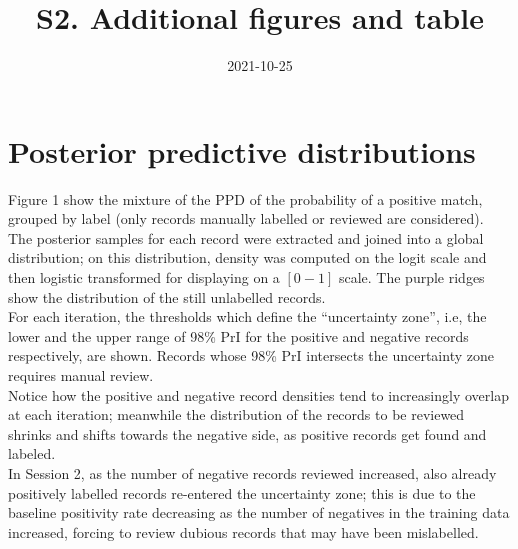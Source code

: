 \documentclass[
]{article}
\title{S2. Additional figures and table}
\author{}
\date{\vspace{-2.5em}2021-10-25}
\begin{document}
\maketitle

{
\setcounter{tocdepth}{2}
\tableofcontents
}
\newpage

\hypertarget{posterior-predictive-distributions}{%
\section{Posterior predictive
distributions}\label{posterior-predictive-distributions}}

Figure 1 show the mixture of the PPD of the probability of a positive
match, grouped by label (only records manually labelled or reviewed are
considered). The posterior samples for each record were extracted and
joined into a global distribution; on this distribution, density was
computed on the logit scale and then logistic transformed for displaying
on a \([0 - 1]\) scale. The purple ridges show the distribution of the
still unlabelled records.\\
For each iteration, the thresholds which define the ``uncertainty
zone'', i.e, the lower and the upper range of 98\% PrI for the positive
and negative records respectively, are shown. Records whose 98\% PrI
intersects the uncertainty zone requires manual review.\\
Notice how the positive and negative record densities tend to
increasingly overlap at each iteration; meanwhile the distribution of
the records to be reviewed shrinks and shifts towards the negative side,
as positive records get found and labeled.\\
In Session 2, as the number of negative records reviewed increased, also
already positively labelled records re-entered the uncertainty zone;
this is due to the baseline positivity rate decreasing as the number of
negatives in the training data increased, forcing to review dubious
records that may have been mislabelled.
\end{document}

